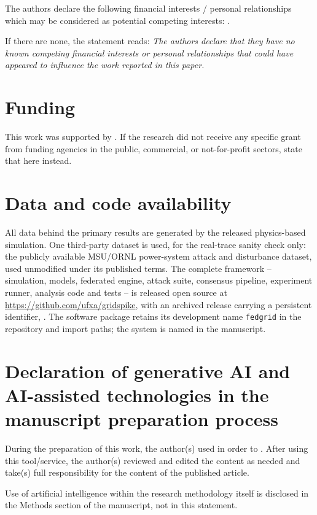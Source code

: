 \documentclass[preprint,11pt]{elsarticle}
\begin{document}
The authors declare the following financial interests / personal relationships
which may be considered as potential competing interests:
.

\medskip
\noindent
If there are none, the statement reads: \emph{The authors declare that they have
no known competing financial interests or personal relationships that could have
appeared to influence the work reported in this paper.}

\section*{Funding}

This work was supported by . If the research
did not receive any specific grant from funding agencies in the public,
commercial, or not-for-profit sectors, state that here instead.

\section*{Data and code availability}

All data behind the primary results are generated by the released
physics-based simulation.
One third-party dataset is used, for the real-trace sanity check only: the
publicly available MSU/ORNL power-system attack and disturbance dataset, used
unmodified under its published terms. The complete framework -- simulation,
models, federated engine, attack
suite, consensus pipeline, experiment runner, analysis code and tests -- is
released open source at \url{https://github.com/ufxa/gridspike}, with an
archived release carrying a persistent identifier, . The software package retains
its development name \texttt{fedgrid} in the repository and import paths; the
system is named \sysname{} in the manuscript.

\section*{Declaration of generative AI and AI-assisted technologies in the manuscript preparation process}

During the preparation of this work, the author(s) used
 in order to
. After using
this tool/service, the author(s) reviewed and edited the content as needed and
take(s) full responsibility for the content of the published article.

\medskip
\noindent
Use of artificial intelligence within the research methodology itself is
disclosed in the Methods section of the manuscript, not in this statement.
\end{document}
